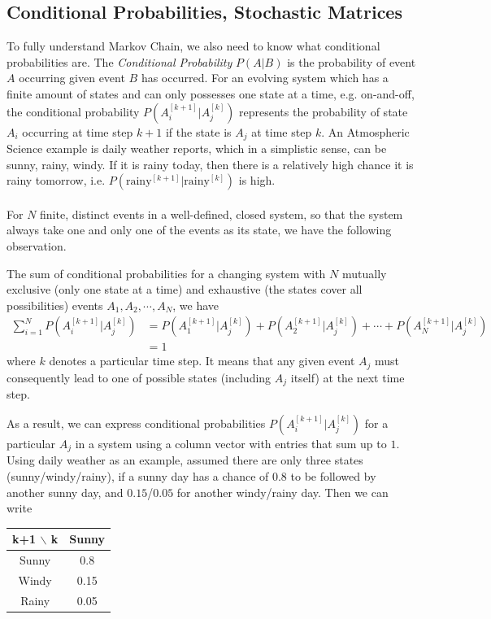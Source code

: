 \subsection{Conditional Probabilities, Stochastic Matrices}
To fully understand Markov Chain, we also need to know what conditional probabilities are. The \textit{Conditional Probability} $P(A|B)$ is the probability of event $A$ occurring given event $B$ has occurred. For an evolving system which has a finite amount of states and can only possesses one state at a time, e.g. on-and-off, the conditional probability $P(A_i^{[k+1]}|A_j^{[k]})$ represents the probability of state $A_i$ occurring at time step $k+1$ if the state is $A_j$ at time step $k$. An Atmospheric Science example is daily weather reports, which in a simplistic sense, can be sunny, rainy, windy. If it is rainy today, then there is a relatively high chance it is rainy tomorrow, i.e. $P(\text{rainy}^{[k+1]}|\text{rainy}^{[k]})$ is high.\\
\\
For $N$ finite, distinct events in a well-defined, closed system, so that the system always take one and only one of the events as its state, we have the following observation.
\begin{thm}
The sum of conditional probabilities for a changing system with $N$ mutually exclusive (only one state at a time) and exhaustive (the states cover all possibilities) events $A_1, A_2, \cdots, A_N$, we have
\begin{align*}
\sum_{i=1}^N P(A_i^{[k+1]}|A_j^{[k]}) &= P(A_1^{[k+1]}|A_j^{[k]}) + P(A_2^{[k+1]}|A_j^{[k]}) + \cdots + P(A_N^{[k+1]}|A_j^{[k]}) \\
&= 1
\end{align*}
where $k$ denotes a particular time step. It means that any given event $A_j$ must consequently lead to one of possible states (including $A_j$ itself) at the next time step.
\end{thm}
As a result, we can express conditional probabilities $P(A_i^{[k+1]}|A_j^{[k]})$ for a particular $A_j$ in a system using a column vector with entries that sum up to $1$. Using daily weather as an example, assumed there are only three states (sunny/windy/rainy), if a sunny day has a chance of $0.8$ to be followed by another sunny day, and $0.15$/$0.05$ for another windy/rainy day. Then we can write
\begin{center}
\begin{tabular}{|c|c|}
\hline
k+1 $\backslash$ k & Sunny \\
\hline
Sunny & 0.8 \\
\hline
Windy & 0.15 \\
\hline 
Rainy & 0.05 \\
\hline
\end{tabular}
\end{center}
